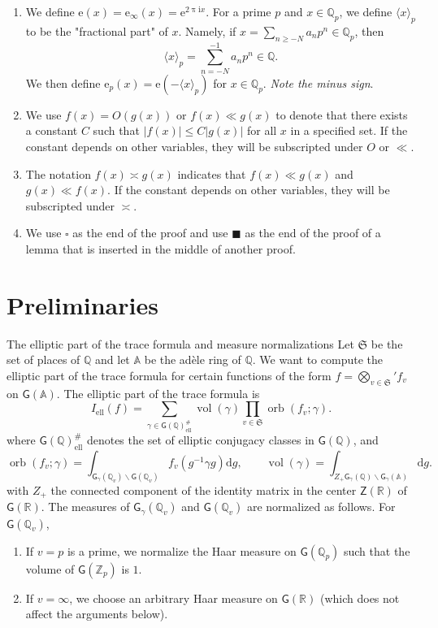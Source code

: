 \documentclass[10pt,oneside,reqno]{amsart}
\makeatletter
\newcommand\rmd{\mathrm{d}}
\newcommand\rme{\mathrm{e}}
\newcommand\rmi{\mathrm{i}}
\renewcommand\AA{\mathbb{A}}
\newcommand\QQ{\mathbb{Q}}
\newcommand\RR{\mathbb{R}}
\newcommand\ZZ{\mathbb{Z}}
\newcommand\mf[1]{\mathfrak{#1}}
\newcommand\G{\mathsf{G}}
\newcommand\Z{\mathsf{Z}}
\newcommand\dpii{2\uppi\rmi}
\newcommand\bs{\backslash}
\newcommand\el{\mathrm{ell}}
\DeclareMathOperator\vol{vol}
\DeclareMathOperator\orb{orb}
\renewcommand\leq{\leqslant}
\renewcommand\geq{\geqslant}
\def\subsection{\@startsection{subsection}{2}%
  \z@{3pt\@plus0pt}{-.5em}%
  {\normalfont\bfseries}}
\theoremstyle{THEOREM}
\theoremstyle{DEFINITION}
\theoremstyle{EXERCISE}
\numberwithin{equation}{section}
\makeatother
\begin{document}
\begin{enumerate}[itemsep=0pt,parsep=0pt,topsep=0pt,leftmargin=0pt,labelsep=3pt,itemindent=9pt,label=\textbullet]
\[    \]
  \item We define $\rme(x)=\rme_\infty(x)=\rme^{\dpii x}$. For a prime $p$ and $x\in \QQ_p$, we define $\langle x\rangle_p$ to be the "fractional part" of $x$. Namely, if $x=\sum_{n\geq -N}a_np^n\in \QQ_p$, then 
      \[
      \langle x\rangle_p=\sum_{n=-N}^{-1}a_np^n\in \QQ.
      \]
      We then define $\rme_p(x)=\rme(-\langle x\rangle_p)$ for $x\in \QQ_p$. \emph{Note the minus sign}.
  \item We use $f(x)=O(g(x))$ or $f(x)\ll g(x)$ to denote that there exists a constant $C$ such that $|f(x)|\leq C|g(x)|$ for all $x$ in a specified set. If the constant depends on other variables, they will be subscripted under $O$ or $\ll$. 
  \item The notation $f(x)\asymp g(x)$ indicates that $f(x)\ll g(x)$ and $g(x)\ll f(x)$. If the constant depends on other variables, they will be subscripted under $\asymp$.
  \item We use $\square$ as the end of the proof and use $\blacksquare$ as the end of the proof of a lemma that is inserted in the middle of another proof.
\end{enumerate}

\section{Preliminaries}\label{sec:preliminaries}

\subsection{The elliptic part of the trace formula and measure normalizations}
Let $\mf{S}$ be the set of places of $\QQ$ and let $\AA$ be the ad\`ele ring of $\QQ$. We want to compute the elliptic part of the trace formula for certain functions of the form $f=\bigotimes_{v\in \mf{S}}' f_v$ on $\G(\AA)$. The elliptic part of the trace formula is
\begin{equation}\label{eq:elliptictrace}
I_\el(f)=\sum_{\gamma\in \G(\QQ)^\#_\el}\vol(\gamma)\prod_{v\in \mathfrak{S}}\orb(f_v;\gamma).
\end{equation}
where $ \G(\QQ)^\#_\el$ denotes the set of elliptic conjugacy classes in $\G(\QQ)$, and
\[
\orb(f_v;\gamma)=\int_{\G_\gamma(\QQ_v)\bs \G(\QQ_v)} f_v(g^{-1}\gamma g)\rmd g,
\qquad
\vol(\gamma)=\int_{Z_+\G_\gamma(\QQ)\bs \G_\gamma(\AA)} \rmd g.
\]
with $Z_+$ the connected component of the identity matrix in the center $\Z(\RR)$ of $\G(\RR)$. The measures of $\G_\gamma(\QQ_v)$ and $\G(\QQ_v)$ are normalized as follows. For $\G(\QQ_v)$, 
\begin{enumerate}[itemsep=0pt,parsep=0pt,topsep=0pt,leftmargin=0pt,labelsep=3pt,itemindent=9pt,label=\textbullet]
  \item If $v=p$ is a prime, we normalize the Haar measure on $\G(\QQ_p)$ such that the volume of $\G(\ZZ_p)$ is $1$.
  \item If $v=\infty$, we choose an arbitrary Haar measure on $\G(\RR)$ (which does not affect the arguments below).
\end{enumerate}
\end{document}
